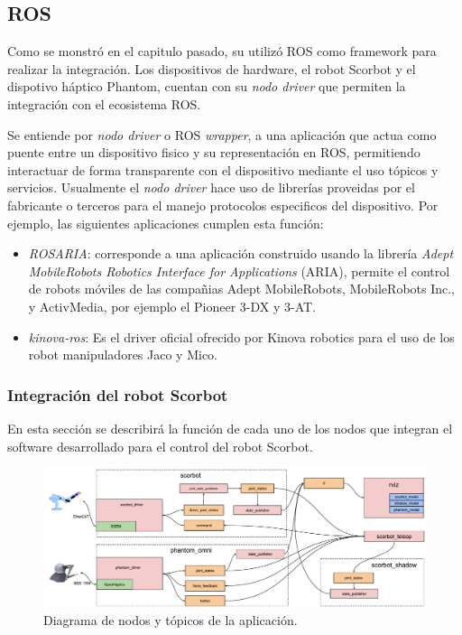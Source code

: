 \subsection{ROS}

Como se monstró en el capitulo pasado, su utilizó ROS como framework para realizar la integración. Los dispositivos de hardware, el robot Scorbot y el dispotivo háptico Phantom, cuentan con su \textit{nodo driver} que permiten la integración con el ecosistema ROS.

Se entiende por \textit{nodo driver} o ROS \textit{wrapper}, a una aplicación que actua como puente entre un dispositivo fisico y su representación en ROS, permitiendo interactuar de forma transparente con el dispositivo mediante el uso tópicos y servicios. Usualmente el \textit{nodo driver} hace uso de librerías proveidas por el fabricante o terceros para el manejo protocolos especificos del dispositivo. Por ejemplo, las siguientes aplicaciones cumplen esta función:

\begin{itemize}

\item \textit{ROSARIA}\cite{rosaria}: corresponde a una aplicación construido usando la librería \textit{Adept MobileRobots Robotics Interface for Applications} (ARIA), permite el control de robots móviles de las compañias Adept MobileRobots, MobileRobots Inc., y ActivMedia, por ejemplo el Pioneer 3-DX y 3-AT.

\item \textit{kinova-ros}\cite{kinova}: Es el driver oficial ofrecido por Kinova robotics para el uso de los robot manipuladores Jaco y Mico.

\end{itemize}

\subsubsection{Integración del robot Scorbot}

En esta sección se describirá la función de cada uno de los nodos que integran el software desarrollado para el control del robot Scorbot.

\begin{figure}[ht]
  \centering
  \includegraphics[width=\textwidth]{img/cap4/scorbot_software.pdf}
  \caption{Diagrama de nodos y tópicos de la aplicación.}
  \label{cap4_scorbot_software}
\end{figure}



